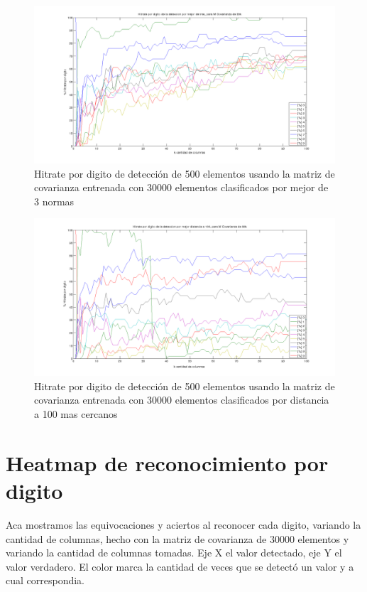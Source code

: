 \begin{figure}[H]
\begin {center}
\includegraphics[width=400pt]{plots/pordig-30kcv-bo3.png}
\end {center}
\caption{Hitrate por digito de detecci\'on de 500 elementos usando la matriz de covarianza entrenada con 30000 elementos
clasificados por mejor de 3 normas}
\label{fig:HRD30kcv-bo3}
\end{figure}

\begin{figure}[H]
\begin {center}
\includegraphics[width=400pt]{plots/pordig-30kcv-100mejores.png}
\end {center}
\caption{Hitrate por digito de detecci\'on de 500 elementos usando la matriz de covarianza entrenada con 30000 elementos
clasificados por distancia a 100 mas cercanos}
\label{fig:HRD30kcv-dist100}
\end{figure}

\section{Heatmap de reconocimiento por digito}
Aca mostramos las equivocaciones y aciertos al reconocer cada digito, variando la cantidad de columnas, hecho con la matriz de covarianza de
30000 elementos y variando la cantidad de columnas tomadas. Eje X el valor detectado, eje Y el valor verdadero. El color marca la cantidad
de veces que se detect\'o un valor y a cual correspondia.

